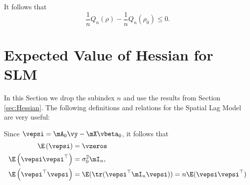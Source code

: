 \documentclass[english,12pt]{book}\usepackage[]{graphicx}\usepackage[]{xcolor}
\begin{document}
\begin{subappendices}
It follows that 
\begin{equation*}
\frac{1}{n}Q_n(\rho) - \frac{1}{n}Q_n(\rho_0) \leq 0.
\end{equation*}








 \section{Expected Value of Hessian for SLM}\label{appendix-EH-sml}

In this Section we drop the subindex $n$ and use the results from Section \ref{sec:Hessian}. The following definitions and relations for the Spatial Lag Model are very useful:

Since $\vepsi  =  \mA_0\vy - \mX\vbeta_0$, it follows that
\begin{align*}
	\E\left(\vepsi\right)      & = \vzeros \\
	\E\left(\vepsi\vepsi^\top\right) &= \sigma^2_0\mI_n, \\
	\E\left(\vepsi^\top\vepsi\right) &= \E(\tr(\vepsi^\top\mI_n\vepsi)) = n\E(\vepsi\vepsi^\top)
\end{align*}


\end{subappendices}
\end{document}
